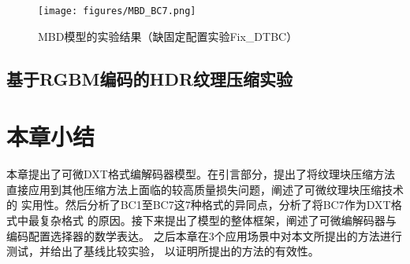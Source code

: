 \begin{figure}[htbp]
    \centering
    \texttt{[image: figures/MBD\_BC7.png]}
    \caption{MBD模型的实验结果（缺固定配置实验Fix\_DTBC）}
    \label{fig:MBD_BC7}
\end{figure}

\subsection{基于RGBM编码的HDR纹理压缩实验}

\section{本章小结}

本章提出了可微DXT格式编解码器模型。在引言部分，提出了将纹理块压缩方法
直接应用到其他压缩方法上面临的较高质量损失问题，阐述了可微纹理块压缩技术的
实用性。然后分析了BC1至BC7这7种格式的异同点，分析了将BC7作为DXT格式中最复杂格式
的原因。接下来提出了模型的整体框架，阐述了可微编解码器与编码配置选择器的数学表达。
之后本章在3个应用场景中对本文所提出的方法进行测试，并给出了基线比较实验，
以证明所提出的方法的有效性。


